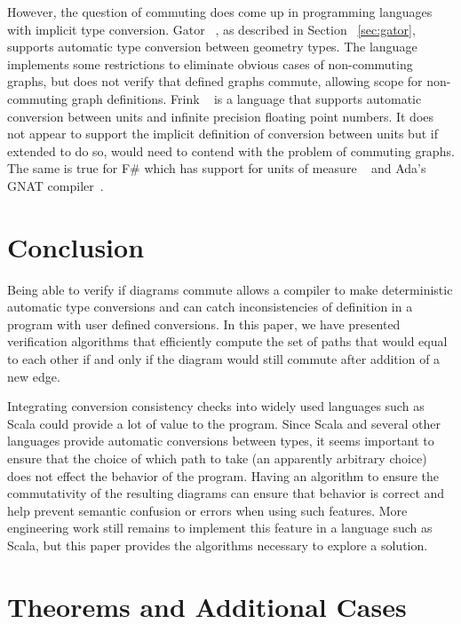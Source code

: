 \documentclass[sigplan,review,nonacm=true]{acmart}
\begin{document}
{However, the question of commuting does come up in programming languages with implicit type conversion.
Gator ~\cite{gator}, as described in Section ~\ref{sec:gator}, supports automatic type conversion between geometry types.
The language implements some restrictions to eliminate obvious cases of non-commuting graphs, but does not verify that defined graphs commute, allowing scope for non-commuting graph definitions.
Frink ~\cite{frink} is a language that supports automatic conversion between units and infinite precision floating point numbers.
It does not appear to support the implicit definition of conversion between units  but if extended to do so, would need to contend with the problem of commuting graphs.
The same is true for F\# which has support for units of measure ~\cite{unitsOfMeasure} and Ada's GNAT compiler~\cite{gnat}.

\section{Conclusion}

Being able to verify if diagrams commute allows a compiler to make
deterministic automatic type conversions and can catch inconsistencies of definition in a program with user defined conversions.  In this paper, we have presented verification algorithms that efficiently compute the set of paths that would equal to each other if and only if the diagram would still commute after addition of a new edge.

Integrating conversion consistency checks into widely used languages such as Scala could provide a lot of value to the program.
Since Scala and several other languages provide automatic conversions between types, it seems important to ensure that the choice of which path to take (an apparently arbitrary choice) does not effect the behavior of the program.
Having an algorithm to ensure the commutativity of the resulting diagrams can ensure that behavior is correct and help prevent semantic confusion or errors when using such features.
More engineering work still remains to implement this feature in a language such as Scala, but this paper provides the algorithms necessary to explore a solution.




\appendix

\section{Theorems and Additional Cases}

}
\end{document}
